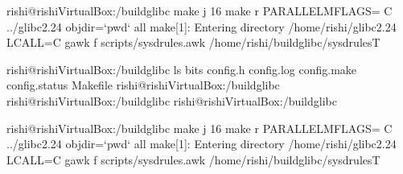 \documentclass[letterpaper,10pt,english]{sphinxmanual}
\begin{document}
\begin{sphinxVerbatim}[commandchars=\\\{\}]
rishi@rishi\PYGZhy{}VirtualBox:\PYGZti{}/build\PYGZus{}glibc\PYGZdl{} make \PYGZhy{}j 16
make \PYGZhy{}r PARALLELMFLAGS=\PYGZdq{}\PYGZdq{} \PYGZhy{}C ../glibc\PYGZhy{}2.24 objdir={}`pwd{}` all
make[1]: Entering directory \PYGZsq{}/home/rishi/glibc\PYGZhy{}2.24\PYGZsq{}
LC\PYGZus{}ALL=C gawk \PYGZhy{}f scripts/sysd\PYGZhy{}rules.awk \PYGZgt{} /home/rishi/build\PYGZus{}glibc/sysd\PYGZhy{}rulesT \PYGZbs{}



rishi@rishi\PYGZhy{}VirtualBox:\PYGZti{}/build\PYGZus{}glibc\PYGZdl{} ls
bits  config.h  config.log  config.make  config.status  Makefile
rishi@rishi\PYGZhy{}VirtualBox:\PYGZti{}/build\PYGZus{}glibc\PYGZdl{}
rishi@rishi\PYGZhy{}VirtualBox:\PYGZti{}/build\PYGZus{}glibc\PYGZdl{}
rishi@rishi\PYGZhy{}VirtualBox:\PYGZti{}/build\PYGZus{}glibc\PYGZdl{}



rishi@rishi\PYGZhy{}VirtualBox:\PYGZti{}/build\PYGZus{}glibc\PYGZdl{} make \PYGZhy{}j 16
make \PYGZhy{}r PARALLELMFLAGS=\PYGZdq{}\PYGZdq{} \PYGZhy{}C ../glibc\PYGZhy{}2.24 objdir={}`pwd{}` all
make[1]: Entering directory \PYGZsq{}/home/rishi/glibc\PYGZhy{}2.24\PYGZsq{}
LC\PYGZus{}ALL=C gawk \PYGZhy{}f scripts/sysd\PYGZhy{}rules.awk \PYGZgt{} /home/rishi/build\PYGZus{}glibc/sysd\PYGZhy{}rulesT \PYGZbs{}


\end{sphinxVerbatim}
\end{document}
